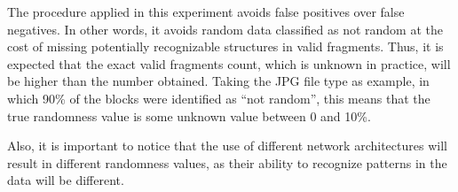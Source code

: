 The procedure applied in this experiment avoids false positives over false negatives. In other words, it avoids random data classified as not random at the cost of missing potentially recognizable structures in valid fragments. Thus, it is expected that the exact valid fragments count, which is unknown in practice, will be higher than the number obtained. Taking the JPG file type as example, in which 90\% of the blocks were identified as ``not random'', this means that the true randomness value is some unknown value between 0 and 10\%.

Also, it is important to notice that the use of different network architectures will result in different randomness values, as their ability to recognize patterns in the data will be different.



